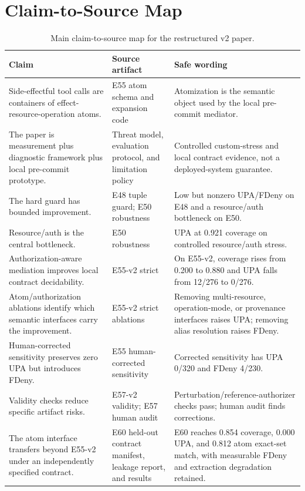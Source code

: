 \section{Claim-to-Source Map}

\begin{table}[ht]
\centering
\small
\caption{Main claim-to-source map for the restructured v2 paper.}
\label{tab:claim-source-map}
\begin{tabularx}{\textwidth}{>{\raggedright\arraybackslash}p{} >{\raggedright\arraybackslash}p{} >{\raggedright\arraybackslash}X}
\toprule
Claim & Source artifact & Safe wording \\
\midrule
Side-effectful tool calls are containers of effect-resource-operation atoms. & E55 atom schema and expansion code & Atomization is the semantic object used by the local pre-commit mediator. \\
The paper is measurement plus diagnostic framework plus local pre-commit prototype. & Threat model, evaluation protocol, and limitation policy & Controlled custom-stress and local contract evidence, not a deployed-system guarantee. \\
The hard guard has bounded improvement. & E48 tuple guard; E50 robustness & Low but nonzero UPA/FDeny on E48 and a resource/auth bottleneck on E50. \\
Resource/auth is the central bottleneck. & E50 robustness & 0.383 UPA at 0.921 coverage on controlled resource/auth stress. \\
Authorization-aware mediation improves local contract decidability. & E55-v2 strict & On E55-v2, coverage rises from 0.200 to 0.880 and UPA falls from 12/276 to 0/276. \\
Atom/authorization ablations identify which semantic interfaces carry the improvement. & E55-v2 strict ablations & Removing multi-resource, operation-mode, or provenance interfaces raises UPA; removing alias resolution raises FDeny. \\
Human-corrected sensitivity preserves zero UPA but introduces FDeny. & E55 human-corrected sensitivity & Corrected sensitivity has UPA 0/320 and FDeny 4/230. \\
Validity checks reduce specific artifact risks. & E57-v2 validity; E57 human audit & Perturbation/reference-authorizer checks pass; human audit finds corrections. \\
The atom interface transfers beyond E55-v2 under an independently specified contract. & E60 held-out contract manifest, leakage report, and results & E60 reaches 0.854 coverage, 0.000 UPA, and 0.812 atom exact-set match, with measurable FDeny and extraction degradation retained. \\

\end{tabularx}
\end{table}
